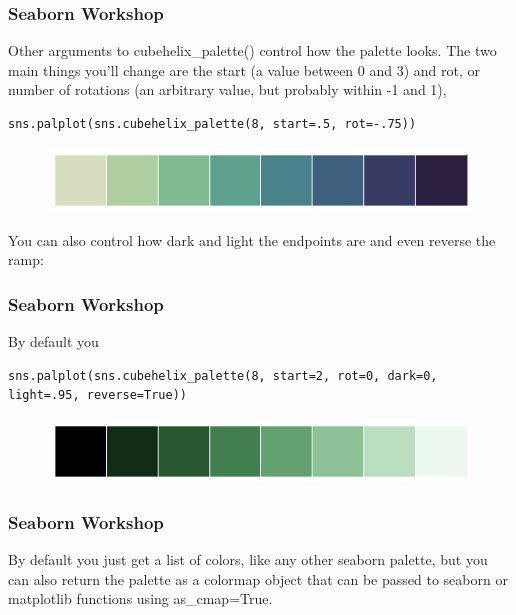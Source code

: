 \documentclass{beamer}
\begin{document}
\begin{frame}[fragile]
\frametitle{Seaborn Workshop}
\large

Other arguments to cubehelix\_palette() control how the palette looks. The two main things you’ll change are the start (a value between 0 and 3) and rot, or number of rotations (an arbitrary value, but probably within -1 and 1),
\begin{verbatim}
sns.palplot(sns.cubehelix_palette(8, start=.5, rot=-.75))
\end{verbatim}

\begin{figure}
	\centering
	\includegraphics[width=0.7\linewidth]{images/color_palettes_36_0}
\end{figure}

You can also control how dark and light the endpoints are and even reverse the ramp:
\end{frame}
\begin{frame}[fragile]
	\frametitle{Seaborn Workshop}
	\large
	By default you
\begin{verbatim}
sns.palplot(sns.cubehelix_palette(8, start=2, rot=0, dark=0, light=.95, reverse=True))
\end{verbatim}

\begin{figure}
	\centering
	\includegraphics[width=0.7\linewidth]{images/color_palettes_38_0}
\end{figure}


\end{frame}
\begin{frame}[fragile]
	\frametitle{Seaborn Workshop}
	\large
By default you just get a list of colors, like any other seaborn palette, but you can also return the palette as a colormap object that can be passed to seaborn or matplotlib functions using as_cmap=True.

\end{frame}
\end{document}
